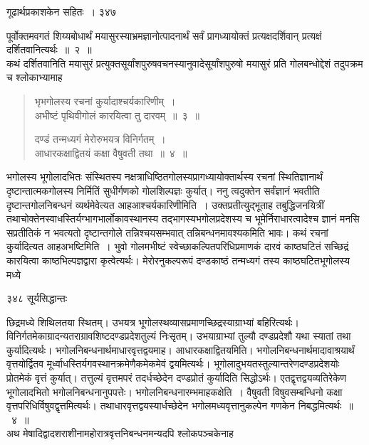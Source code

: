 \documentclass[11pt, openany]{book}
\begin{document}
\newpage


\hspace{3cm} गूढार्थप्रकाशकेन सहितः~। \hfill ३४७
\vspace{1cm}


\noindent पूर्वोक्तमवगतं शिय्यबोधार्थं मयासुरस्याभ्रमज्ञानोत्पादनार्थं सर्वं प्रागध्यायोक्तं प्रत्यक्षदर्शिवान् प्रत्यक्षं दर्शितवानित्यर्थः~॥~२~॥\\
\noindent कथं दर्शितवानिति मयासुरं प्रत्युक्तसूर्यांशपुरुषवचनस्यानुवादेसूर्यांशपुरुषो मयासुरं प्रति गोलबन्धोद्देशं तदुपक्रम च श्लोकाभ्यामाह \textendash


  \begin{quote}
{\ssi भृभगोलस्य रचनां कुर्यादाश्चर्यकारिणीम्~।\\  
अभीष्टं पृथिवीगोलं कारयित्वा तु दारवम्~॥~३~॥

दण्डं तन्मध्यगं मेरोरुभयत्र विनिर्गतम्~।\\
आधारकक्षाद्वितयं कक्षा वैषुवती तथा~॥~४~॥ }
\end{quote}
 भगोलस्य भूगोलादभितः संस्थितस्य नक्षत्राधिष्ठितगोलस्यप्रागध्यायोक्तार्थस्य रचनां स्थितिज्ञानार्थं दृष्टान्तात्मकगोलस्य निर्मितिं सुधीर्गणको गोलशिल्पज्ञः कुर्यात्। ननु त्वदुक्तेन सर्वंज्ञानं भवतीति दृष्टान्तगोलनिबन्धनं व्यर्थमेवेत्यत आह\textendash आश्चर्यकारिणीमिति~। उक्तप्रतीत्युद्भूताह तबुद्धिजनयित्रीं तथाचोक्तेनस्वाधस्तिर्यग्भागभार्लोकावस्थानस्य तद्भागस्यभगोलप्रदेशस्य च भूमेर्निराधारत्वादेश्च ज्ञानं मनसि सप्रतीतिकं न भवत्यतो दृष्टान्तगोले तन्निश्चयसम्भवात् तन्निबन्धनमावश्यकमिति भावः। कथं रचनां कुर्यादित्यत आह\textendash अभष्टिमिति~। भुवो गोलमभीष्टं स्वेच्छाकल्पितपरिधिप्रमाणकं दारवं काष्ठघटितं सच्छिद्रं कारयित्वा काष्ठभिल्पज्ञद्वारा कृत्वेत्यर्थः। मेरोरनुकल्परूपं दण्डकाष्ठं तन्मध्यगं तस्य काष्ठघटितभूगोलस्य मध्ये \textendash


\newpage


\noindent ३४८ \hspace{4cm} सूर्यसिद्धान्तः
\vspace{1cm}

%
\noindent छिद्रमध्ये शिथिलतया स्थितम्। उभयत्र भूगोलस्थव्यासप्रमाणच्छिद्रस्याग्राभ्यां बहिरित्यर्थः। विनिर्गतमेकाग्रादन्यतराग्रावशिष्टदण्डप्रदेशतुल्यं निःसृतम्। उभयाग्राभ्यां तुल्यौ दण्डप्रदेशौ यथा स्यातां तथा कुर्यादित्यर्थः। भगोलनिबन्धनार्थमाधारवृत्तद्वयमाह। आधारकक्षाद्वितयमिति। भगोलनिबन्धनार्थमादावाश्रयार्थं वृत्तयोर्द्वितव मूर्ध्वाधस्तिर्यगवस्थानक्रमेणैकमेकमेवं द्वयमित्यर्थः। भूगोलादुभयतस्तुल्यान्तरेणदण्डप्रदेशयोः प्रोतमेकं वृत्तं कुर्यात्। तत्तुल्यं वृत्तमपरं तदर्धच्छेदेन दण्डप्रोतं कुर्यादिति सिद्धोऽर्थः। एतद्वृत्तद्वयव्यतिरेकेण भूगोलादभितो भगोलनिबन्धनानुपपत्तेः। भगोलनिबन्धनारम्भमाह\textendash कक्षेति~। वैषुवती विषुवसम्बन्धिनो कक्षा वृत्तपरिधिर्विषुवद्वृत्तमित्यर्थः। तथाधारवृत्तद्वयस्यार्धच्छेदेन भगोलमध्यवृत्तानुकल्पेन गणकेन निबद्धमित्यर्थः~॥~४~॥ \\
\noindent अथ मेषादिद्वादशराशीनामहोरात्रवृत्तनिबन्धनमन्यदपि श्लोकपञ्चकेनाह \textendash 
\end{document}
